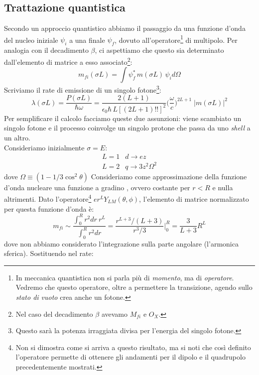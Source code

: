 \subsection{Trattazione quantistica}\label{sec-gamma-multipoli}
Secondo un approccio quantistico abbiamo il passaggio da una funzione d'onda del nucleo iniziale $\psi_i$ a una finale $\psi_f$, dovuto all'operatore\footnote{In meccanica quantistica non si parla più di \textit{momento}, ma di \textit{operatore}. Vedremo che questo operatore, oltre a permettere la transizione, agendo sullo \textit{stato di vuoto} crea anche un fotone.} di multipolo. Per analogia con il decadimento $\beta$, ci aspettiamo che questo sia determinato dall'elemento di matrice a esso associato\footnote{Nel caso del decadimento $\beta$ avevamo $M_{fi}$ e $O_X$.}:
$$m_{fi}(\sigma L) = \int \psi_f^*\, m(\sigma L)\, \psi_i d\Omega$$
Scriviamo il rate di emissione di un singolo fotone\footnote{Questo sarà la potenza irraggiata divisa per l'energia del singolo fotone.}:
\begin{equation*}\label{0308_rate}
    \lambda (\sigma L) = \frac{P(\sigma L)}{\hbar \omega} = \frac{2(L+1)}{\epsilon_0\hbar\,L[(2L+1)!!]^2} \bigl ( \frac{\omega}{c}\bigr)^{2L+1} \; |m(\sigma L)|^2
\end{equation*}
Per semplificare il calcolo facciamo queste due assunzioni: viene scambiato un singolo fotone e il processo coinvolge un singolo protone che passa da uno \textit{shell} a un altro.\\ Consideriamo inizialmente $\sigma = E$:
\begin{displaymath}
\begin{array}{ll}
    L=1 & d\to ez \\
    L=2 & q\to 3z^2\Omega^2
\end{array}
\end{displaymath}
dove $\Omega \equiv (1-1/3\cos^2{\theta})$
Consideriamo come approssimazione della funzione d'onda nucleare una funzione a gradino , ovvero costante per $r<R$ e nulla altrimenti. Dato l'operatore\footnote{Non si dimostra come si arriva a questo risultato, ma si noti che così definito l'operatore permette di ottenere gli andamenti per il dipolo e il quadrupolo precedentemente mostrati.} $e r^L Y_{LM}(\theta, \phi)$, l'elemento di matrice normalizzato per questa funzione d'onda è:
$$m_{fi} \sim \frac{\int_0^R r^2 dr\: r^L}{\int_0^R r^2 dr} = \frac{r^{L+3}/ (L+3)}{r^3 / 3}\Biggr |_0^R = \frac{3}{L+3}R^L$$
dove non abbiamo considerato l'integrazione sulla parte angolare (l'armonica sferica). Sostituendo nel rate:
